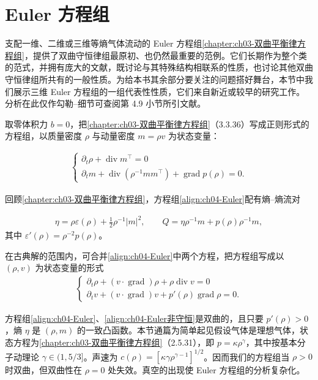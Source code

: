 ﻿\documentclass[../../main.tex]{subfiles}
\begin{document}
\section{Euler 方程组}\label{section:ch04-Euler方程}

支配一维、二维或三维等熵气体流动的 Euler 方程组\cref{chapter:ch03-双曲平衡律方程组}，提供了双曲守恒律组最原初、也仍然最重要的范例。它们长期作为整个类的范式，并拥有庞大的文献，既讨论与其特殊结构相联系的性质，也讨论其他双曲守恒律组所共有的一般性质。为给本书其余部分要关注的问题搭好舞台，本节中我们展示三维 Euler 方程组的一组代表性性质，它们来自新近或较早的研究工作。分析在此仅作勾勒--细节可查阅第 4.9 小节所引文献。


取零体积力 $b=0$，把\cref{chapter:ch03-双曲平衡律方程组}（3.3.36）写成正则形式的方程组，以质量密度 $\rho$ 与动量密度 $m=\rho v$ 为状态变量：

\begin{align}
\begin{cases}
\partial_{t}\rho+\operatorname{div}m^{\top}=0\\
\partial_{t}m+\operatorname{div}(\rho^{-1}mm^{\top})+\operatorname{grad}p(\rho)=0.
\end{cases}
\label{align:ch04-Euler}
\end{align}

回顾\cref{chapter:ch03-双曲平衡律方程组}，方程组\eqref{align:ch04-Euler}配有熵--熵流对

\begin{align}
\eta=\rho\varepsilon(\rho)+\tfrac{1}{2}\rho^{-1}|m|^{2},\qquad Q=\eta\rho^{-1}m+p(\rho)\rho^{-1}m,
\label{align:ch04-Euler熵}
\end{align}
其中 $\varepsilon'(\rho)=\rho^{-2}p(\rho)$。

在古典解的范围内，可合并\eqref{align:ch04-Euler}中两个方程，把方程组写成以 $(\rho,v)$ 为状态变量的形式
\begin{align}
\begin{cases}
\partial_{t}\rho+(v\cdot\operatorname{grad})\rho+\rho\operatorname{div}v=0\\
\partial_{t}v+(v\cdot\operatorname{grad})v+p'(\rho)\operatorname{grad}\rho=0.
\end{cases}
\label{align:ch04-Euler非守恒}
\end{align}

方程组\eqref{align:ch04-Euler}、\eqref{align:ch04-Euler非守恒}是双曲的，且只要 $p'(\rho)>0$，熵 $\eta$ 是 $(\rho,m)$ 的一致凸函数。本节通篇为简单起见假设气体是理想气体，状态方程为\cref{chapter:ch03-双曲平衡律方程组}（2.5.31），即 $p=\kappa\rho^{\gamma}$，其中按基本分子动理论 $\gamma\in(1,5/3]$。声速为 $c(\rho)=[\kappa\gamma\rho^{\gamma-1}]^{1/2}$。因而我们的方程组当 $\rho>0$ 时双曲，但双曲性在 $\rho=0$ 处失效。真空的出现使 Euler 方程组的分析复杂化。
\end{document}
